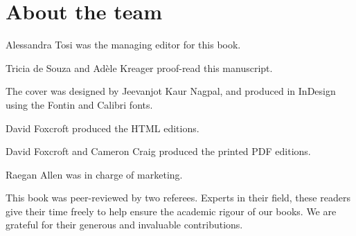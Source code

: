\printendnotes
\newpage

\chapter{About the team}

Alessandra Tosi was the managing editor for this book.

Tricia de Souza and Adèle Kreager proof-read this manuscript.

The cover was designed by Jeevanjot Kaur Nagpal, and produced in InDesign using the Fontin and Calibri fonts.

David Foxcroft produced the HTML editions.

David Foxcroft and Cameron Craig produced the printed PDF editions. 

Raegan Allen was in charge of marketing.

This book was peer-reviewed by two referees. Experts in their field, these readers give their time freely to help ensure the academic rigour of our books. We are grateful for their generous and invaluable contributions.

\newpage


%
